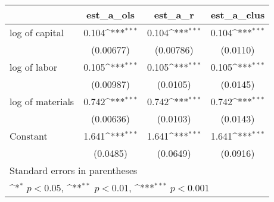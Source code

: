 {
\def\sym#1{\ifmmode^{#1}\else\(^{#1}\)\fi}
\begin{tabular}{l*{3}{c}}
\hline\hline
                    &\multicolumn{1}{c}{est\_a\_ols}&\multicolumn{1}{c}{est\_a\_r}&\multicolumn{1}{c}{est\_a\_clus}\\
\hline
log of capital      &       0.104\sym{***}&       0.104\sym{***}&       0.104\sym{***}\\
                    &   (0.00677)         &   (0.00786)         &    (0.0110)         \\
[1em]
log of labor        &       0.105\sym{***}&       0.105\sym{***}&       0.105\sym{***}\\
                    &   (0.00987)         &    (0.0105)         &    (0.0145)         \\
[1em]
log of materials    &       0.742\sym{***}&       0.742\sym{***}&       0.742\sym{***}\\
                    &   (0.00636)         &    (0.0103)         &    (0.0143)         \\
[1em]
Constant            &       1.641\sym{***}&       1.641\sym{***}&       1.641\sym{***}\\
                    &    (0.0485)         &    (0.0649)         &    (0.0916)         \\
\hline\hline
\multicolumn{4}{l}{\footnotesize Standard errors in parentheses}\\
\multicolumn{4}{l}{\footnotesize \sym{*} \(p<0.05\), \sym{**} \(p<0.01\), \sym{***} \(p<0.001\)}\\
\end{tabular}
}

